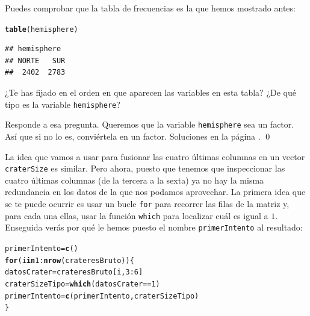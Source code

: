 \documentclass[10pt,a4paper]{article}\usepackage[]{graphicx}\usepackage[]{color}
\makeatletter
\newcommand{\hlnum}[1]{\textcolor[rgb]{0.686,0.059,0.569}{#1}}%
\newcommand{\hlopt}[1]{\textcolor[rgb]{0,0,0}{#1}}%
\newcommand{\hlstd}[1]{\textcolor[rgb]{0.345,0.345,0.345}{#1}}%
\newcommand{\hlkwa}[1]{\textcolor[rgb]{0.161,0.373,0.58}{\textbf{#1}}}%
\newcommand{\hlkwb}[1]{\textcolor[rgb]{0.69,0.353,0.396}{#1}}%
\newcommand{\hlkwd}[1]{\textcolor[rgb]{0.737,0.353,0.396}{\textbf{#1}}}%
\newenvironment{kframe}{%
 \def\at@end@of@kframe{}%
 \ifinner\ifhmode%
  \def\at@end@of@kframe{\end{minipage}}%
  \begin{minipage}{\columnwidth}%
 \fi\fi%
 \def\FrameCommand##1{\hskip\@totalleftmargin \hskip-\fboxsep
 \colorbox{shadecolor}{##1}\hskip-\fboxsep
     \hskip-\linewidth \hskip-\@totalleftmargin \hskip\columnwidth}%
 \MakeFramed {\advance\hsize-\width
   \@totalleftmargin\z@ \linewidth\hsize
   \@setminipage}}%
 {\par\unskip\endMakeFramed%
 \at@end@of@kframe}
\newenvironment{knitrout}{}{} %
\makeatother
\begin{document}
Puedes comprobar que la tabla de frecuencias es la que hemos mostrado antes:
\begin{knitrout}
\color{fgcolor}\begin{kframe}
\begin{alltt}
\hlkwd{table}\hlstd{(hemisphere)}
\end{alltt}
\begin{verbatim}
## hemisphere
## NORTE   SUR 
##  2402  2783
\end{verbatim}
\end{kframe}
\end{knitrout}
¿Te has fijado en el orden en que aparecen las variables en esta tabla? ¿De qué tipo es la variable {\tt hemisphere}?

\begin{ejercicio}
\label{tut12:ejercicio04}
Responde a esa pregunta. Queremos que la variable {\tt hemisphere} sea un factor. Así que si no lo es, conviértela en un factor. Soluciones en la página \pageref{tut12:ejercicio04:sol}.
\qed
\end{ejercicio}

La idea que vamos a usar para fusionar las cuatro últimas columnas en un vector {\tt craterSize} es similar. Pero ahora, puesto que tenemos que inspeccionar las cuatro últimas columnas (de la tercera a la sexta) ya no hay la misma redundancia en los datos de la que nos podamos aprovechar. La primera idea que se te puede ocurrir es usar un bucle {\tt for} para recorrer las filas de la matriz y, para cada una ellas, usar la función {\tt which} para localizar cuál es igual a $1$. Enseguida verás por qué le hemos puesto el nombre {\tt primerIntento} al resultado:

\begin{knitrout}
\color{fgcolor}\begin{kframe}
\begin{alltt}
\hlstd{primerIntento} \hlkwb{=} \hlkwd{c}\hlstd{()}
\hlkwa{for}\hlstd{(i} \hlkwa{in} \hlnum{1}\hlopt{:}\hlkwd{nrow}\hlstd{(crateresBruto))\{}
  \hlstd{datosCrater} \hlkwb{=} \hlstd{crateresBruto[i,} \hlnum{3}\hlopt{:}\hlnum{6}\hlstd{]}
  \hlstd{craterSizeTipo} \hlkwb{=} \hlkwd{which}\hlstd{(datosCrater} \hlopt{==} \hlnum{1}\hlstd{)}
  \hlstd{primerIntento} \hlkwb{=} \hlkwd{c}\hlstd{(primerIntento, craterSizeTipo)}
\hlstd{\}}
\end{alltt}
\end{kframe}
\end{knitrout}
\end{document}
